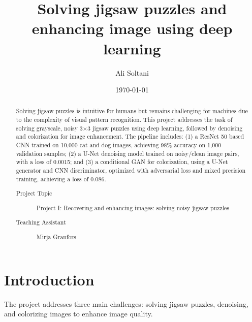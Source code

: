 \documentclass[%
 reprint,
 amsmath,amssymb,
 aps,
]{revtex4-2}
\begin{document}
\title{Solving jigsaw puzzles and enhancing image using deep learning}%

\author{Ali Soltani}


\date{\today}%

\begin{abstract} %

Solving jigsaw puzzles is intuitive for humans but remains challenging for machines due to the complexity of visual pattern recognition. This project addresses the task of solving grayscale, noisy 3×3 jigsaw puzzles using deep learning, followed by denoising and colorization for image enhancement. The pipeline includes: (1) a ResNet 50 based CNN trained on 10,000 cat and dog images, achieving 98\% accuracy on 1,000 validation samples; (2) a U-Net denoising model trained on noisy/clean image pairs, with a loss of 0.0015; and (3) a conditional GAN for colorization, using a U-Net generator and CNN discriminator, optimized with adversarial loss and mixed precision training, achieving a loss of 0.086.

\begin{description} %
\item[Project Topic] %
{Project I: Recovering and enhancing images: solving noisy jigsaw puzzles} %
\item[Teaching Assistant] %
{Mirja Granfors} %
\end{description} %
\end{abstract}

\maketitle




\section{\label{sec:intro}Introduction} %
The project addresses three main challenges: solving jigsaw puzzles, denoising, and colorizing images to enhance image quality.
\end{document}
